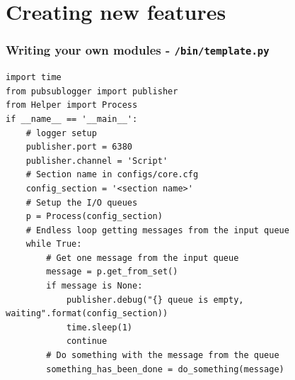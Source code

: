 \documentclass{beamer}
\begin{document}
\section{Creating new features}


\lstset{style=code}
\begin{frame}[fragile]
    \frametitle{Writing your own modules - \texttt{/bin/template.py}}
    \begin{lstlisting}
import time
from pubsublogger import publisher
from Helper import Process
if __name__ == '__main__':
    # logger setup
    publisher.port = 6380
    publisher.channel = 'Script'
    # Section name in configs/core.cfg
    config_section = '<section name>'
    # Setup the I/O queues
    p = Process(config_section)
    # Endless loop getting messages from the input queue
    while True:
        # Get one message from the input queue
        message = p.get_from_set()
        if message is None:
            publisher.debug("{} queue is empty, waiting".format(config_section))
            time.sleep(1)
            continue
        # Do something with the message from the queue
        something_has_been_done = do_something(message)
    \end{lstlisting}
\end{frame}
\end{document}
